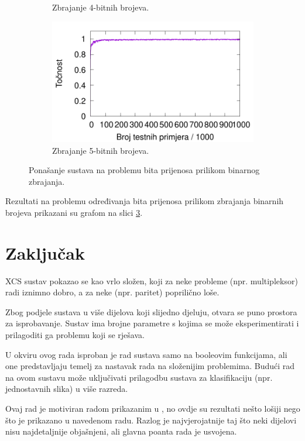 \documentclass[times, utf8, zavrsni]{fer}
\begin{document}
\begin{figure}[!h]
\begin{subfigure}{0.496\textwidth}
        \caption{Zbrajanje 4-bitnih brojeva.}
        \label{fig:8care}
    \end{subfigure}
    \begin{subfigure}{0.496\textwidth}
        \centering
        \includegraphics[width=\textwidth]{img/carry/10care.pdf}
        \caption{Zbrajanje 5-bitnih brojeva.}
        \label{fig:10care}
    \end{subfigure}
    \caption{Ponašanje sustava na problemu bita prijenosa prilikom binarnog zbrajanja.}
    \label{fig:care}
\end{figure}
Rezultati na problemu određivanja bita prijenosa prilikom zbrajanja binarnih brojeva prikazani su grafom na slici \ref{fig:care}.

\chapter{Zaključak} \label{ch:zak}
XCS sustav pokazao se kao vrlo složen, koji za neke probleme (npr. multipleksor) radi iznimno dobro, a za neke (npr. paritet) poprilično loše.

Zbog podjele sustava u više dijelova koji slijedno djeluju, otvara se puno prostora za isprobavanje.
Sustav ima brojne parametre s kojima se može eksperimentirati i prilagoditi ga problemu koji se rješava.

U okviru ovog rada isproban je rad sustava samo na booleovim funkcijama, ali one predstavljaju temelj za nastavak rada na složenijim problemima.
Budući rad na ovom sustavu može uključivati prilagodbu sustava za klasifikaciju (npr. jednostavnih slika) u više razreda.

Ovaj rad je motiviran radom prikazanim u \citep{4}, no ovdje su rezultati nešto lošiji nego što je prikazano u navedenom radu.
Razlog je najvjerojatnije taj što neki dijelovi nisu najdetaljnije objašnjeni, ali glavna poanta rada je usvojena.
\end{document}
